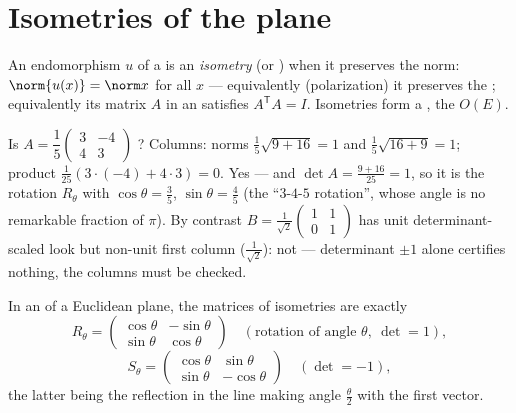 \section{Isometries of the plane}

\begin{definition}\label{def:b1:euclid:isometry}
An endomorphism $u$ of a  is an
\emph{isometry} (or  ) when it
preserves the norm: $\norm{u(x)} = \norm x$ for all $x$ ---
equivalently (polarization) it preserves the ;
equivalently its matrix $A$ in an   satisfies
$A^{\mathsf T} A = I$. Isometries form a , the  
$O(E)$.
\end{definition}

\begin{example}
\label{ex:b1:euclid:recognize}
Is $A = \dfrac15\begin{pmatrix} 3 & -4\\ 4 & 3\end{pmatrix}$
? Columns: norms $\frac15\sqrt{9 + 16} = 1$ and
$\frac15\sqrt{16 + 9} = 1$; product $\frac1{25}(3\cdot(-4) +
4\cdot3) = 0$. Yes --- and $\det A = \frac{9 + 16}{25} = 1$, so
it is the rotation $R_\theta$ with $\cos\theta = \frac35$,
$\sin\theta = \frac45$ (the ``$3$-$4$-$5$ rotation'', whose
angle is no remarkable fraction of $\pi$). By contrast $B =
\frac{1}{\sqrt2}\begin{pmatrix} 1 & 1\\ 0 & 1\end{pmatrix}$ has
unit determinant-scaled look but non-unit first column
($\frac1{\sqrt2}$): not  --- determinant $\pm1$ alone
certifies nothing, the columns must be checked.
\end{example}

\begin{theorem}\label{thm:b1:euclid:plane}
In an   of a Euclidean plane, the matrices of
isometries are exactly
\[
R_\theta = \begin{pmatrix}
\cos\theta & -\sin\theta\\ \sin\theta & \cos\theta
\end{pmatrix}
\quad (\text{rotation of angle } \theta,\ \det = 1),
\]
\[
S_\theta = \begin{pmatrix}
\cos\theta & \sin\theta\\ \sin\theta & -\cos\theta
\end{pmatrix}
\quad (\det = -1),
\]
the latter being the reflection in the line making angle
$\frac\theta2$ with the first  vector.
\end{theorem}

